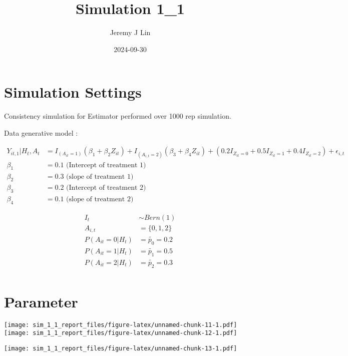 \documentclass[
]{article}
\title{Simulation 1\_1}
\author{Jeremy J Lin}
\date{2024-09-30}
\begin{document}
\maketitle

\section{Simulation Settings}\label{simulation-settings}

Consistency simulation for Estimator performed over 1000 rep simulation.

Data generative model :

\begin{align*}
  Y_{it, 1} | H_t, A_t &= I_{(A_{it} = 1)}(\beta_1  + \beta_2 Z_{it})+ I_{(A_{i,t} = 2)}(\beta_3 + \beta_4 Z_{it}) + (0.2 I_{Z_{it} = 0} + 0.5 I_{Z_{it} = 1} + 0.4 I_{Z_{it} = 2})+ \epsilon_{i,t}\\
  \beta_1 &= 0.1 \text{ (Intercept of treatment 1)}\\
  \beta_2 &= 0.3 \text{ (slope of treatment 1)}\\
  \beta_3 &= 0.2 \text{ (Intercept of treatment 2)}\\
  \beta_4 &= 0.1 \text{ (slope of treatment 2)}
\end{align*}

\begin{align*}
  I_t &\sim Bern (1)\\
  A_{i,t} &= \{0, 1, 2\}\\
  P(A_{it} = 0 |H_t) &=\tilde{p_0}  = 0.2\\
  P(A_{it} = 1 |H_t) &=\tilde{p_1}  = 0.5\\
  P(A_{it} = 2 |H_t) &=\tilde{p_2}  = 0.3\\
\end{align*}

\section{Parameter}\label{parameter}

\texttt{[image: sim\_1\_1\_report\_files/figure-latex/unnamed-chunk-11-1.pdf]}
\texttt{[image: sim\_1\_1\_report\_files/figure-latex/unnamed-chunk-12-1.pdf]}

\texttt{[image: sim\_1\_1\_report\_files/figure-latex/unnamed-chunk-13-1.pdf]}
\end{document}
